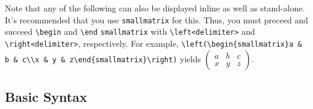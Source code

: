 \documentclass[10pt, english]{article}
\begin{document}
Note that any of the following can also be displayed inline as well as stand-alone. It's recommended that you use \verb|smallmatrix| for this. Thus, you must preceed and succeed \verb|\begin| and \verb|\end| \verb|smallmatrix| with \verb|\left<delimiter>| and \verb|\right<delimiter>|, respectively. For example, \verb|\left(\begin{smallmatrix}a & b & c\\x & y & z\end{smallmatrix}\right)| yields $\left(\begin{smallmatrix}a & b & c\\x & y & z\end{smallmatrix}\right)$. 

	\subsection{Basic Syntax}
\end{document}
